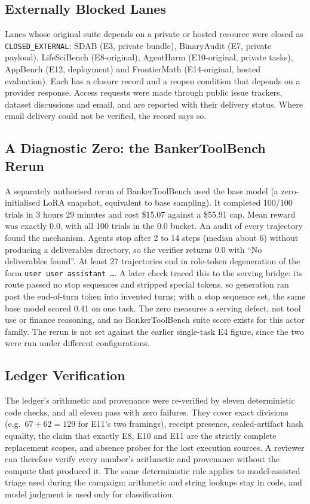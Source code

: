 \documentclass[runningheads]{llncs}
\begin{document}
\subsection{Externally Blocked Lanes}

Lanes whose original suite depends on a private or hosted resource were closed
as \texttt{CLOSED\_EXTERNAL}: SDAB (E3, private bundle), BinaryAudit (E7,
private payload), LifeSciBench (E8-original), AgentHarm (E10-original, private
tasks), AppBench (E12, deployment) and FrontierMath (E14-original, hosted
evaluation). Each has a closure record and a reopen condition that depends on
a provider response. Access requests
were made through public issue trackers, dataset discussions and email, and
are reported with their delivery status. Where email delivery could not be
verified, the record says so.

\subsection{A Diagnostic Zero: the BankerToolBench Rerun}

A separately authorised rerun of BankerToolBench used the base model (a
zero-initialised LoRA snapshot, equivalent to base sampling). It completed
100/100 trials in 3 hours 29 minutes and cost \$15.07 against a \$55.91 cap.
Mean reward was exactly 0.0, with all 100 trials in the 0.0 bucket. An audit of
every trajectory found the mechanism. Agents stop after 2 to 14 steps (median
about 6) without producing a deliverables directory, so the verifier returns 0.0
with ``No deliverables found''. At least 27 trajectories end in role-token
degeneration of the form \texttt{user user assistant \dots}. A later check
traced this to the serving bridge: its route passed no stop sequences and
stripped special tokens, so generation ran past the end-of-turn token into
invented turns; with a stop sequence set, the same base model scored 0.41 on
one task. The zero measures a serving defect, not tool use or finance
reasoning, and no BankerToolBench suite score exists for this actor family. The rerun is not set against the earlier
single-task E4 figure, since the two were run under different configurations.

\subsection{Ledger Verification}

The ledger's arithmetic and provenance were re-verified by eleven deterministic
code checks, and all eleven pass with zero failures. They cover exact divisions
(e.g.\ $67 + 62 = 129$ for E11's two framings), receipt presence,
sealed-artifact hash equality, the claim that exactly E8, E10 and E11 are the
strictly complete replacement scopes, and absence probes for the lost execution
sources. A reviewer can therefore verify every number's arithmetic and
provenance without the compute that produced it. The same deterministic rule
applies to model-assisted triage used during the campaign: arithmetic and
string lookups stay in code, and model judgment is used only for
classification.
\end{document}
